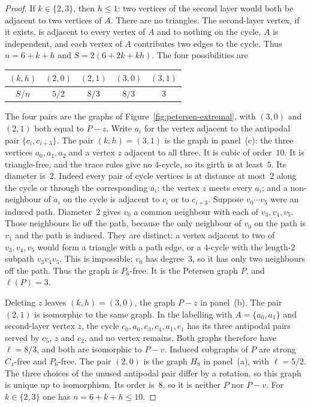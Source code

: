 \documentclass[ASNA]{USG}
\theoremstyle{WBstyletwo}
\numberwithin{equation}{section}
\newcommand{\lr}{\ell}
\begin{document}
\begin{proof}
If $k\in\{2,3\}$, then $h\le 1$: two vertices of the second layer would both be adjacent to two vertices of $A$. There are no triangles. The second-layer vertex, if it exists, is adjacent to every vertex of $A$ and to nothing on the cycle, $A$ is independent, and each vertex of $A$ contributes two edges to the cycle. Thus $n=6+k+h$ and $S=2(6+2k+kh)$. The four possibilities are
\begin{center}
\begin{tabular}{@{}ccccc@{}}
\toprule
$(k,h)$ & $(2,0)$ & $(2,1)$ & $(3,0)$ & $(3,1)$\\
\midrule
$S/n$ & $5/2$ & $8/3$ & $8/3$ & $3$\\
\bottomrule
\end{tabular}
\end{center}
The four pairs are the graphs of Figure~\ref{fig:petersen-extremal}, with $(3,0)$ and $(2,1)$ both equal to $P-z$. Write $a_i$ for the vertex adjacent to the antipodal pair $\{c_i,c_{i+3}\}$. The pair $(k,h)=(3,1)$ is the graph in panel~(c): the three vertices $a_0,a_1,a_2$ and a vertex $z$ adjacent to all three. It is cubic of order~$10$. It is triangle-free, and the trace rules give no $4$-cycle, so its girth is at least~$5$. Its diameter is~$2$. Indeed every pair of cycle vertices is at distance at most~$2$ along the cycle or through the corresponding $a_i$; the vertex $z$ meets every $a_i$; and a non-neighbour of $a_i$ on the cycle is adjacent to $c_i$ or to $c_{i+3}$. Suppose $v_0\cdots v_5$ were an induced path. Diameter~$2$ gives $v_0$ a common neighbour with each of $v_3,v_4,v_5$. Those neighbours lie off the path, because the only neighbour of $v_0$ on the path is $v_1$ and the path is induced. They are distinct: a vertex adjacent to two of $v_3,v_4,v_5$ would form a triangle with a path edge, or a $4$-cycle with the length-$2$ subpath $v_3v_4v_5$. This is impossible: $v_0$ has degree~$3$, so it has only two neighbours off the path. Thus the graph is $P_6$-free. It is the Petersen graph $P$, and $\lr(P)=3$.

Deleting $z$ leaves $(k,h)=(3,0)$, the graph $P-z$ in panel~(b). The pair $(2,1)$ is isomorphic to the same graph. In the labelling with $A=\{a_0,a_1\}$ and second-layer vertex $z$, the cycle $c_0,a_0,c_3,c_4,a_1,c_1$ has its three antipodal pairs served by $c_5$, $z$ and $c_2$, and no vertex remains. Both graphs therefore have $\lr=8/3$, and both are isomorphic to $P-v$. Induced subgraphs of $P$ are strong $C_4$-free and $P_6$-free. The pair $(2,0)$ is the graph $H_8$ in panel~(a), with $\lr=5/2$. The three choices of the unused antipodal pair differ by a rotation, so this graph is unique up to isomorphism. Its order is~$8$, so it is neither $P$ nor $P-v$. For $k\in\{2,3\}$ one has $n=6+k+h\le 10$.


\end{proof}
\end{document}
